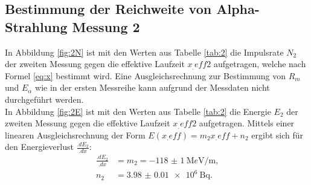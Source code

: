 \subsection{Bestimmung der Reichweite von Alpha-Strahlung Messung 2}

In Abbildung \ref{fig:2N} ist mit den Werten aus Tabelle \ref{tab:2} die Impulsrate $N_2$ der zweiten Messung gegen die effektive Laufzeit $x_.{eff2}$ aufgetragen, welche nach Formel \eqref{eq:x} bestimmt wird. Eine Ausgleichsrechnung zur Bestimmung von $R_m$ und $E_\alpha$ wie in der ersten Messreihe kann aufgrund der Messdaten nicht durchgeführt werden.\\
In Abbildung \ref{fig:2E} ist mit den Werten aus Tabelle \ref{tab:2} die Energie $E_2$ der zweiten Messung gegen die effektive Laufzeit $x_.{eff2}$ aufgetragen.
Mittels einer linearen Ausgleichsrechnung der Form $E(x_.{eff})=m_2 x_.{eff} +n_2$ ergibt sich für den Energieverlust $\frac{.dE_2}{.dx}$:
\begin{align*}
\frac{.dE_2}{.dx}	&= m_2 = \SI{-118(1)}{\mega e\volt\per\metre}\text{,}\\
n_2	&= \SI{3.98(1)e6}{\becquerel}\text{.}
\end{align*}

